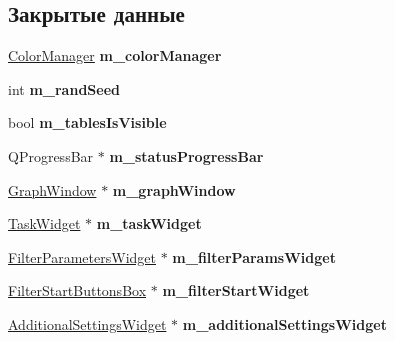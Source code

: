 \subsection*{Закрытые данные}
\begin{DoxyCompactItemize}
\item 
\hypertarget{class_main_window_a6c0331486f528b76b569fc02baf1037e}{}\label{class_main_window_a6c0331486f528b76b569fc02baf1037e} 
\hyperlink{class_color_manager}{Color\+Manager} {\bfseries m\+\_\+color\+Manager}
\item 
\hypertarget{class_main_window_a35d09b312795b853ef4b75508c0c371d}{}\label{class_main_window_a35d09b312795b853ef4b75508c0c371d} 
int {\bfseries m\+\_\+rand\+Seed}
\item 
\hypertarget{class_main_window_a6ea719792b7699a0d5e81181ba6f5b2c}{}\label{class_main_window_a6ea719792b7699a0d5e81181ba6f5b2c} 
bool {\bfseries m\+\_\+tables\+Is\+Visible}
\item 
\hypertarget{class_main_window_a17685071143ec93292f9e6909ab78901}{}\label{class_main_window_a17685071143ec93292f9e6909ab78901} 
Q\+Progress\+Bar $\ast$ {\bfseries m\+\_\+status\+Progress\+Bar}
\item 
\hypertarget{class_main_window_a7f1ee1494ff008c4a7f6d395ecaac87e}{}\label{class_main_window_a7f1ee1494ff008c4a7f6d395ecaac87e} 
\hyperlink{class_graph_window}{Graph\+Window} $\ast$ {\bfseries m\+\_\+graph\+Window}
\item 
\hypertarget{class_main_window_acc365673b948684fd72adbf4924c0c97}{}\label{class_main_window_acc365673b948684fd72adbf4924c0c97} 
\hyperlink{class_task_widget}{Task\+Widget} $\ast$ {\bfseries m\+\_\+task\+Widget}
\item 
\hypertarget{class_main_window_a463e4f6880ba393e7b8d3de20e7fc96a}{}\label{class_main_window_a463e4f6880ba393e7b8d3de20e7fc96a} 
\hyperlink{class_filter_parameters_widget}{Filter\+Parameters\+Widget} $\ast$ {\bfseries m\+\_\+filter\+Params\+Widget}
\item 
\hypertarget{class_main_window_a88d26017f0ec68df1ec9a8d9cd53fd8a}{}\label{class_main_window_a88d26017f0ec68df1ec9a8d9cd53fd8a} 
\hyperlink{class_filter_start_buttons_box}{Filter\+Start\+Buttons\+Box} $\ast$ {\bfseries m\+\_\+filter\+Start\+Widget}
\item 
\hypertarget{class_main_window_a8e9f2e35383ec89002744d7dd52cb508}{}\label{class_main_window_a8e9f2e35383ec89002744d7dd52cb508} 
\hyperlink{class_additional_settings_widget}{Additional\+Settings\+Widget} $\ast$ {\bfseries m\+\_\+additional\+Settings\+Widget}
\item 

\end{DoxyCompactItemize}
